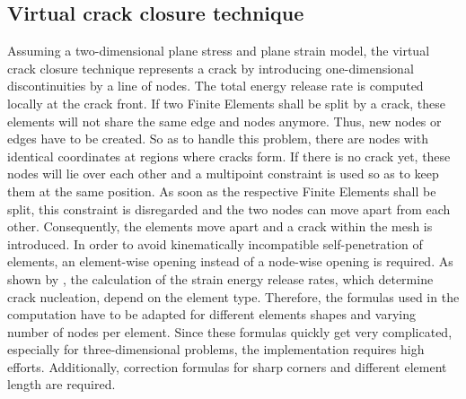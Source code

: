 \subsection{Virtual crack closure technique} \label{sec:intro_virtClos}
Assuming a two-dimensional plane stress and plane strain model, the virtual crack closure technique represents a crack by introducing one-dimensional discontinuities by a line of nodes. The total energy release rate is computed locally at the crack front. If two Finite Elements shall be split by a crack, these elements will not share the same edge and nodes anymore. Thus, new nodes or edges have to be created. So as to handle this problem, there are nodes with identical coordinates at regions where cracks form. If there is no crack yet, these nodes will lie over each other and a multipoint constraint is used so as to keep them at the same position. As soon as the respective Finite Elements shall be split, this constraint is disregarded and the two nodes can move apart from each other. Consequently, the elements move apart and a crack within the mesh is introduced. In order to avoid kinematically incompatible self-penetration of elements, an element-wise opening instead of a node-wise opening is required. As shown by \citet{03_SotA_virtClos}, the calculation of the strain energy release rates, which determine crack nucleation, depend on the element type. Therefore, the formulas used in the computation have to be adapted for different elements shapes and varying number of nodes per element. Since these formulas quickly get very complicated, especially for three-dimensional problems, the implementation requires high efforts. Additionally, correction formulas for sharp corners and different element length are required. \cite{03_SotA_virtClos} 

